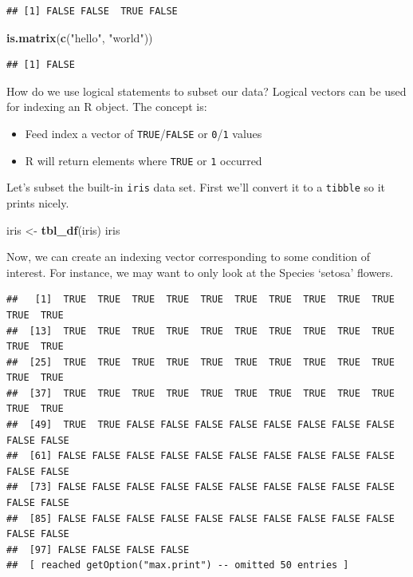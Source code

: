 \documentclass[
]{book}
\newenvironment{Shaded}{\begin{snugshade}}{\end{snugshade}}
\newcommand{\CommentTok}[1]{\textcolor[rgb]{0.56,0.35,0.01}{\textit{#1}}}
\newcommand{\KeywordTok}[1]{\textcolor[rgb]{0.13,0.29,0.53}{\textbf{#1}}}
\newcommand{\NormalTok}[1]{#1}
\newcommand{\OperatorTok}[1]{\textcolor[rgb]{0.81,0.36,0.00}{\textbf{#1}}}
\newcommand{\StringTok}[1]{\textcolor[rgb]{0.31,0.60,0.02}{#1}}
\providecommand{\tightlist}{%
  \setlength{\itemsep}{0pt}\setlength{\parskip}{0pt}}
\theoremstyle{definition}
\theoremstyle{definition}
\theoremstyle{definition}
\theoremstyle{remark}
\begin{document}
\begin{verbatim}
## [1] FALSE FALSE  TRUE FALSE
\end{verbatim}

\begin{Shaded}
\begin{Highlighting}[]
\KeywordTok{is.matrix}\NormalTok{(}\KeywordTok{c}\NormalTok{(}\StringTok{"hello"}\NormalTok{, }\StringTok{"world"}\NormalTok{))}
\end{Highlighting}
\end{Shaded}

\begin{verbatim}
## [1] FALSE
\end{verbatim}

How do we use logical statements to subset our data? Logical vectors can be used for indexing an R object. The concept is:

\begin{itemize}
\tightlist
\item
  Feed index a vector of \texttt{TRUE}/\texttt{FALSE} or \texttt{0}/\texttt{1} values\\
\item
  R will return elements where \texttt{TRUE} or \texttt{1} occurred
\end{itemize}

Let's subset the built-in \texttt{iris} data set. First we'll convert it to a \texttt{tibble} so it prints nicely.

\begin{Shaded}
\begin{Highlighting}[]
\NormalTok{iris <-}\StringTok{ }\KeywordTok{tbl_df}\NormalTok{(iris)}
\NormalTok{iris}
\end{Highlighting}
\end{Shaded}

Now, we can create an indexing vector corresponding to some condition of interest. For instance, we may want to only look at the Species `setosa' flowers.

\begin{Shaded}
\end{Shaded}

\begin{verbatim}
##   [1]  TRUE  TRUE  TRUE  TRUE  TRUE  TRUE  TRUE  TRUE  TRUE  TRUE  TRUE  TRUE
##  [13]  TRUE  TRUE  TRUE  TRUE  TRUE  TRUE  TRUE  TRUE  TRUE  TRUE  TRUE  TRUE
##  [25]  TRUE  TRUE  TRUE  TRUE  TRUE  TRUE  TRUE  TRUE  TRUE  TRUE  TRUE  TRUE
##  [37]  TRUE  TRUE  TRUE  TRUE  TRUE  TRUE  TRUE  TRUE  TRUE  TRUE  TRUE  TRUE
##  [49]  TRUE  TRUE FALSE FALSE FALSE FALSE FALSE FALSE FALSE FALSE FALSE FALSE
##  [61] FALSE FALSE FALSE FALSE FALSE FALSE FALSE FALSE FALSE FALSE FALSE FALSE
##  [73] FALSE FALSE FALSE FALSE FALSE FALSE FALSE FALSE FALSE FALSE FALSE FALSE
##  [85] FALSE FALSE FALSE FALSE FALSE FALSE FALSE FALSE FALSE FALSE FALSE FALSE
##  [97] FALSE FALSE FALSE FALSE
##  [ reached getOption("max.print") -- omitted 50 entries ]
\end{verbatim}
\end{document}
